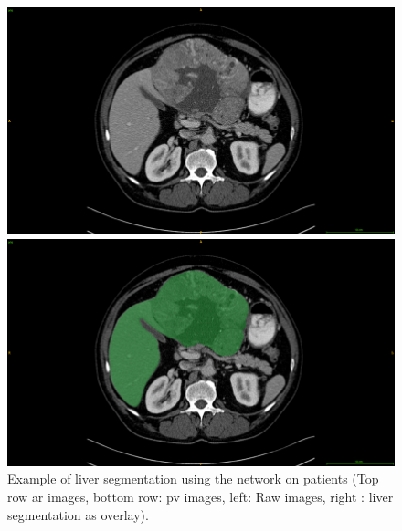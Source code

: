 \begin{figure}[ht!]
\vspace{0.8cm}
\begin{minipage}{0.45\linewidth}
\includegraphics[width=0.9\linewidth]{../HistologicalGradePrediction/images/ResizeTCIA_CECTLiver_prediction_TCGA-DD-A11A_slice42_raw}
\end{minipage}
\hspace{0.3cm}
\begin{minipage}{0.45\linewidth}
\includegraphics[width=0.9\linewidth]{../HistologicalGradePrediction/images/ResizeTCIA_CECTLiver_prediction_TCGA-DD-A11A_slice42_greenLiver}
\end{minipage}
\caption{Example of liver segmentation using the  network on \textbf{}
patients (Top row \ac{ar} images, bottom row: \ac{pv} images, left:
Raw images, right : liver segmentation as overlay).}
\label{fig:LiverPredTciaDb}
\end{figure}

